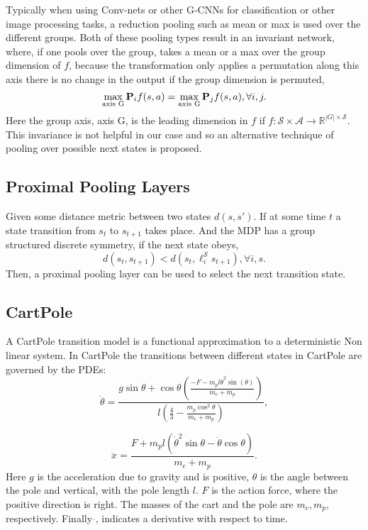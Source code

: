 Typically when using Conv-nets or other G-CNNs for classification or other image processing tasks, a reduction pooling such as mean or max is used over the different groups. Both of these pooling types result in an invariant network, where, if one pools over the group, takes a mean or a max over the group dimension of $f$, because the transformation only applies a permutation along this axis there is no change in the output if the group dimension is permuted,
\begin{equation}
	\max_\text{axis G} \mathbf{P}_i f(s, a) = \max_\text{axis G} \mathbf{P}_j f(s, a), \forall i, j.
\end{equation}
Here the group axis, axis G, is the leading dimension in $f$ if $f: \mathcal{S} \times \mathcal{A} \rightarrow \mathbb{R}^{|G| \times \mathcal{S}}$. This invariance is not helpful in our case and so an alternative technique of pooling over possible next states is proposed.


\subsection{Proximal Pooling Layers}
\begin{proposition}
	Given some distance metric between two states $d(s, s')$. If at some time $t$ a state transition from $s_t$ to $s_{t+1}$ takes place. And the MDP has a group structured discrete symmetry, if the next state obeys,
	\begin{equation}
		d(s_t, s_{t+1}) < d(s_t, \ell_i^\mathcal{S}s_{t + 1}), \forall i, s.
	\end{equation}
	Then, a proximal pooling layer can be used to select the next transition state.
\end{proposition}


\subsection{CartPole}
A CartPole transition model is a functional approximation to a deterministic Non linear system. In CartPole the transitions between different states in CartPole are governed by the PDEs:
\begin{equation}
\ddot{\theta} = \frac{g \sin \theta + \cos\theta \left({\frac{-F - m_p l \dot{\theta}^2 \sin(\theta)}{m_c + m_p}} \right )}{l\left ( \frac{4}{3} - \frac{m_p \cos^2 \theta}{m_c + m_p}\right)},
\end {equation}

\begin{equation}
	\ddot{x} = \frac{ F + m_p l (\dot{\theta}^2 \sin \theta - \ddot{\theta} \cos \theta)}{m_c + m_p}.
\end{equation}
Here $g$ is the acceleration due to gravity and is positive, $\theta$ is the angle between the pole and vertical, with the pole length $l$. $F$ is the action force, where the positive direction is right. The masses of the cart and the pole are $m_c, m_p$, respectively. Finally $\dot{}$, indicates a derivative with respect to time.

